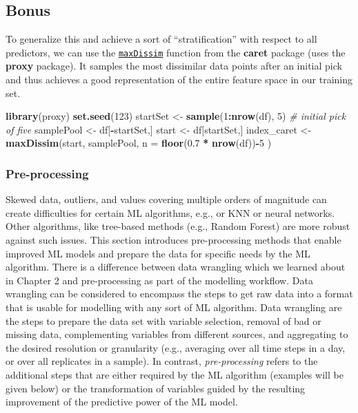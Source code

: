 \documentclass[
]{book}
\newenvironment{Shaded}{\begin{snugshade}}{\end{snugshade}}
\newcommand{\CommentTok}[1]{\textcolor[rgb]{0.56,0.35,0.01}{\textit{#1}}}
\newcommand{\DataTypeTok}[1]{\textcolor[rgb]{0.13,0.29,0.53}{#1}}
\newcommand{\DecValTok}[1]{\textcolor[rgb]{0.00,0.00,0.81}{#1}}
\newcommand{\FloatTok}[1]{\textcolor[rgb]{0.00,0.00,0.81}{#1}}
\newcommand{\KeywordTok}[1]{\textcolor[rgb]{0.13,0.29,0.53}{\textbf{#1}}}
\newcommand{\NormalTok}[1]{#1}
\newcommand{\OperatorTok}[1]{\textcolor[rgb]{0.81,0.36,0.00}{\textbf{#1}}}
\newcommand{\StringTok}[1]{\textcolor[rgb]{0.31,0.60,0.02}{#1}}
\begin{document}
\hypertarget{bonus}{%
\subsection{Bonus}\label{bonus}}

To generalize this and achieve a sort of ``stratification'' with respect to all predictors, we can use the \href{https://topepo.github.io/caret/data-splitting.html\#splitting-based-on-the-predictors}{\texttt{maxDissim}} function from the \textbf{caret} package (uses the \textbf{proxy} package). It samples the most dissimilar data points after an initial pick and thus achieves a good representation of the entire feature space in our training set.

\begin{Shaded}
\begin{Highlighting}[]
\KeywordTok{library}\NormalTok{(proxy)}
\KeywordTok{set.seed}\NormalTok{(}\DecValTok{123}\NormalTok{)}
\NormalTok{startSet <-}\StringTok{ }\KeywordTok{sample}\NormalTok{(}\DecValTok{1}\OperatorTok{:}\KeywordTok{nrow}\NormalTok{(df), }\DecValTok{5}\NormalTok{)   }\CommentTok{# initial pick of five}
\NormalTok{samplePool <-}\StringTok{ }\NormalTok{df[}\OperatorTok{-}\NormalTok{startSet,]}
\NormalTok{start <-}\StringTok{ }\NormalTok{df[startSet,]}
\NormalTok{index_caret <-}\StringTok{ }\KeywordTok{maxDissim}\NormalTok{(start, samplePool, }\DataTypeTok{n =} \KeywordTok{floor}\NormalTok{(}\FloatTok{0.7} \OperatorTok{*}\StringTok{ }\KeywordTok{nrow}\NormalTok{(df))}\OperatorTok{-}\DecValTok{5}\NormalTok{ )}
\end{Highlighting}
\end{Shaded}

\hypertarget{pre-processing}{%
\subsubsection{Pre-processing}\label{pre-processing}}

Skewed data, outliers, and values covering multiple orders of magnitude can create difficulties for certain ML algorithms, e.g., or KNN or neural networks. Other algorithms, like tree-based methods (e.g., Random Forest) are more robust against such issues. This section introduces pre-processing methods that enable improved ML models and prepare the data for specific needs by the ML algorithm. There is a difference between data wrangling which we learned about in Chapter 2 and pre-processing as part of the modelling workflow. Data wrangling can be considered to encompass the steps to get raw data into a format that is usable for modelling with any sort of ML algorithm. Data wrangling are the steps to prepare the data set with variable selection, removal of bad or missing data, complementing variables from different sources, and aggregating to the desired resolution or granularity (e.g., averaging over all time steps in a day, or over all replicates in a sample). In contrast, \emph{pre-processing} refers to the additional steps that are either required by the ML algorithm (examples will be given below) or the transformation of variables guided by the resulting improvement of the predictive power of the ML model.
\end{document}
